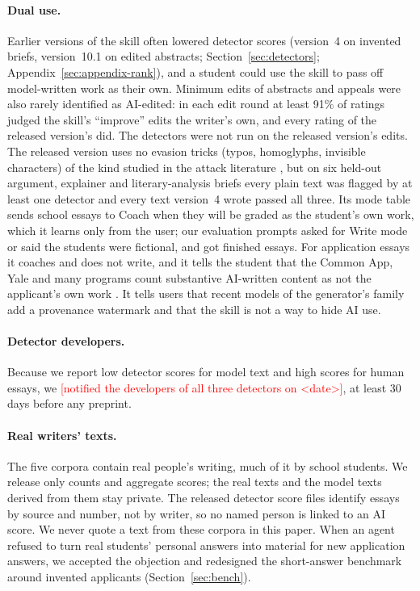 \documentclass[11pt]{article}
\newcommand{\TBD}[1]{\textcolor{red}{[#1]}}
\begin{document}
\paragraph{Dual use.} Earlier versions of the skill often lowered detector scores (version~4 on invented briefs, version~10.1 on edited abstracts; Section~\ref{sec:detectors}; Appendix~\ref{sec:appendix-rank}), and a student could use the skill to pass off model-written work as their own. Minimum edits of abstracts and appeals were also rarely identified as AI-edited: in each edit round at least 91\% of ratings judged the skill's ``improve'' edits the writer's own, and every rating of the released version's did. The detectors were not run on the released version's edits. The released version uses no evasion tricks (typos, homoglyphs, invisible characters) of the kind studied in the attack literature \citep{krishna2023paraphrasing,sadasivan2025reliably}, but on six held-out argument, explainer and literary-analysis briefs every plain text was flagged by at least one detector and every text version~4 wrote passed all three. Its mode table sends school essays to Coach when they will be graded as the student's own work, which it learns only from the user; our evaluation prompts asked for Write mode or said the students were fictional, and got finished essays. For application essays it coaches and does not write, and it tells the student that the Common App, Yale and many programs count substantive AI-written content as not the applicant's own work \citep{commonapp2023fraud,yale2026ai}. It tells users that recent models of the generator's family add a provenance watermark \citep{anthropic2026marks,bleeping2026watermark} and that the skill is not a way to hide AI use.

\paragraph{Detector developers.} Because we report low detector scores for model text and high scores for human essays, we \TBD{notified the developers of all three detectors on <date>}, at least 30 days before any preprint.

\paragraph{Real writers' texts.} The five corpora contain real people's writing, much of it by school students. We release only counts and aggregate scores; the real texts and the model texts derived from them stay private. The released detector score files identify essays by source and number, not by writer, so no named person is linked to an AI score. We never quote a text from these corpora in this paper. When an agent refused to turn real students' personal answers into material for new application answers, we accepted the objection and redesigned the short-answer benchmark around invented applicants (Section~\ref{sec:bench}).
\end{document}
